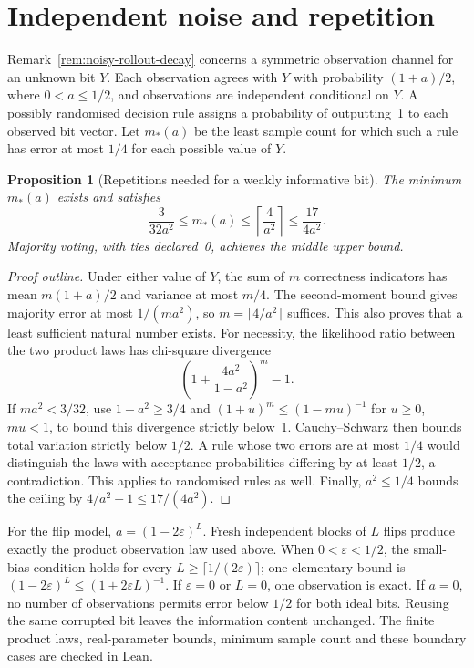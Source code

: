 \documentclass[11pt]{article}
\theoremstyle{plain}
\newtheorem{proposition}[theorem]{Proposition}
\theoremstyle{definition}
\theoremstyle{remark}
\numberwithin{equation}{section}
\begin{document}
\section{Independent noise and repetition}
\label{app:noise-samples}

Remark~\ref{rem:noisy-rollout-decay} concerns a symmetric observation channel for an unknown bit $Y$. Each observation agrees with $Y$ with probability $(1+a)/2$, where $0<a\le1/2$, and observations are independent conditional on $Y$. A possibly randomised decision rule assigns a probability of outputting~1 to each observed bit vector. Let $m_*(a)$ be the least sample count for which such a rule has error at most $1/4$ for each possible value of $Y$.

\begin{proposition}[Repetitions needed for a weakly informative bit]
\label{prop:noise-samples}
The minimum $m_*(a)$ exists and satisfies
\[
\frac{3}{32a^2}\le m_*(a)\le\left\lceil\frac{4}{a^2}\right\rceil
\le\frac{17}{4a^2}.
\]
Majority voting, with ties declared~0, achieves the middle upper bound.
\end{proposition}
\begin{proof}[Proof outline]
Under either value of $Y$, the sum of $m$ correctness indicators has mean $m(1+a)/2$ and variance at most $m/4$. The second-moment bound gives majority error at most $1/(ma^2)$, so $m=\lceil4/a^2\rceil$ suffices. This also proves that a least sufficient natural number exists. For necessity, the likelihood ratio between the two product laws has chi-square divergence
\[
\left(1+\frac{4a^2}{1-a^2}\right)^m-1.
\]
If $ma^2<3/32$, use $1-a^2\ge3/4$ and
$(1+u)^m\le(1-mu)^{-1}$ for $u\ge0$, $mu<1$, to bound this divergence strictly below~1. Cauchy--Schwarz then bounds total variation strictly below $1/2$. A rule whose two errors are at most $1/4$ would distinguish the laws with acceptance probabilities differing by at least $1/2$, a contradiction. This applies to randomised rules as well. Finally, $a^2\le1/4$ bounds the ceiling by $4/a^2+1\le17/(4a^2)$.
\end{proof}

For the flip model, $a=(1-2\varepsilon)^L$. Fresh independent blocks of $L$ flips produce exactly the product observation law used above. When $0<\varepsilon<1/2$, the small-bias condition holds for every $L\ge\lceil1/(2\varepsilon)\rceil$; one elementary bound is $(1-2\varepsilon)^L\le(1+2\varepsilon L)^{-1}$. If $\varepsilon=0$ or $L=0$, one observation is exact. If $a=0$, no number of observations permits error below $1/2$ for both ideal bits. Reusing the same corrupted bit leaves the information content unchanged. The finite product laws, real-parameter bounds, minimum sample count and these boundary cases are checked in Lean.
\end{document}
